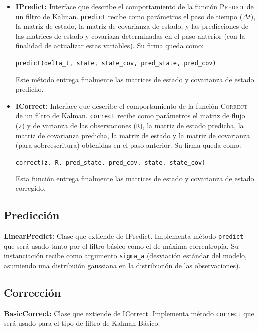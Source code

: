 \begin{itemize}
\item \textbf{IPredict:} Interface que describe el comportamiento de la funci\'on \textsc{Predict} de un filtro de Kalman. \texttt{predict} recibe como par\'ametros el paso de tiempo ($\Delta t$), la matriz de estado, la matriz de covarianza de estado, y las predicciones de las matrices de estado y covariaza determinadas en el paso anterior (con la finalidad de actualizar estas variables). Su firma queda como:
\begin{center}
\texttt{predict(delta\_t, state, state\_cov, pred\_state, pred\_cov)}
\end{center}
Este m\'etodo entrega finalmente las matrices de estado y covarianza de estado predicho.
\bigskip

\item \textbf{ICorrect:} Interface que describe el comportamiento de la funci\'on \textsc{Correct} de un filtro de Kalman. \texttt{correct} recibe como par\'ametros el matriz de flujo (\texttt{z}) y de varianza de las observaciones (\texttt{R}), la matriz de estado predicha, la matriz de covarianza predicha, la matriz de estado y la matriz de covarianza (para sobreescritura) obtenidas en el paso anterior. Su firma queda como:
\begin{center}
\texttt{correct(z, R, pred\_state, pred\_cov, state, state\_cov)}
\end{center}
\bigskip
Esta funci\'on entrega finalmente las matrices de estado y covarianza de estado corregido.

\end{itemize}

\subsection{Predicci\'on}
\textbf{LinearPredict:} Clase que extiende de IPredict. Implementa m\'etodo \texttt{predict} que ser\'a usado tanto por el filtro b\'asico como el de m\'axima correntrop\'ia. Su instanciaci\'on recibe como argumento \texttt{sigma\_a} (desviaci\'on est\'andar del modelo, asumiendo una distribui\'on gaussiana en la distribuci\'on de las observaciones).
\bigskip


\subsection{Correcci\'on}
\textbf{BasicCorrect:} Clase que extiende de ICorrect. Implementa m\'etodo \texttt{correct} que ser\'a usado para el tipo de filtro de Kalman B\'asico.
\bigskip

